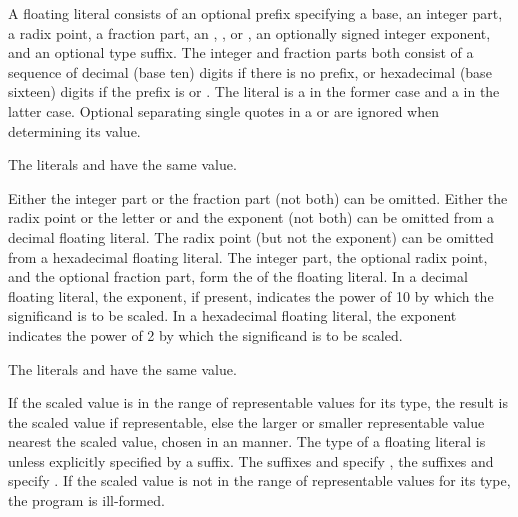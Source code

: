 \pnum
{}%
A floating literal consists of
an optional prefix specifying a base,
an integer part,
a radix point,
a fraction part,
%
%
%
%
an , ,  or ,
an optionally signed integer exponent, and
an optional type suffix.
The integer and fraction parts both consist of
a sequence of decimal (base ten) digits if there is no prefix, or
hexadecimal (base sixteen) digits if the prefix is  or .
%
The literal is a  in the former case and
%
a  in the latter case.
Optional separating single quotes in
a  or 
are ignored when determining its value.
\begin{example} The literals  and 
have the same value. \end{example}
Either the integer part or the fraction part (not both) can be omitted.
Either the radix point or the letter  or  and
the exponent (not both) can be omitted from a decimal floating literal.
The radix point (but not the exponent) can be omitted
from a hexadecimal floating literal.
The integer part, the optional radix point, and the optional fraction part,
form the  of the floating literal.
In a decimal floating literal, the exponent, if present,
indicates the power of 10 by which the significand is to be scaled.
In a hexadecimal floating literal, the exponent
indicates the power of 2 by which the significand is to be scaled.
\begin{example}
The literals  and  have the same value.
\end{example}
If the scaled value is in
the range of representable values for its type, the result is the scaled
value if representable, else the larger or smaller representable value
nearest the scaled value, chosen in an  manner.
%
The type of a floating literal is 
%
unless explicitly specified by a suffix.
%
%
%
The suffixes  and  specify ,
%
%
%
the suffixes  and  specify 
. If the scaled value is not in the range of representable
values for its type, the program is ill-formed.

